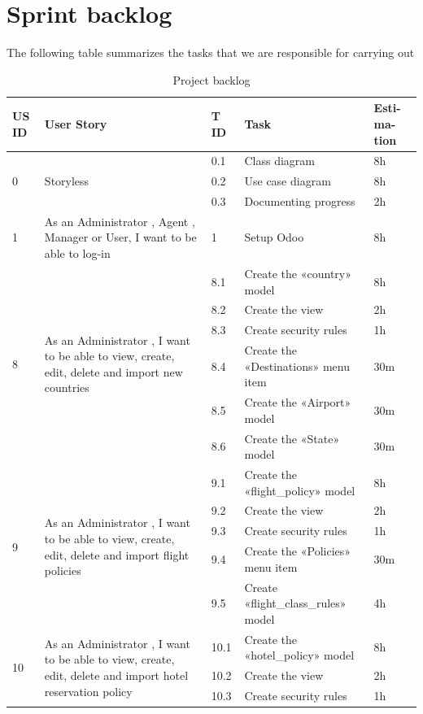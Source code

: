 \section{Sprint backlog}
The following table summarizes the tasks that we are responsible for carrying out 
\begin{center}
\begin{longtable}{|p{1cm}|p{}|p{}|p{}|p{}|}
\caption{ Project backlog }
\hline
\textbf{US ID} 
&\textbf{User Story}
&\textbf{T ID}
&\textbf{Task}
&\textbf{Esti- ma- tion}
\\
\hline
\multirow{ 3}{*}{0}
&\multirow{3}{*}{Storyless}
&0.1
&Class diagram
&8h\\\cline{3-5}
&
&0.2
&Use case diagram
&8h\\\cline{3-5}
&
&0.3
&Documenting progress
&2h\\\cline{3-5}
\hline
1
&As an Administrator , Agent , Manager or User, I want to be able to log-in
&1
&Setup Odoo
&8h
\\\hline


\multirow{ 6}{*}{8}
&\multirow{6}{=}{As an Administrator , I want to be able to view, create, edit, delete and import new countries}
&8.1
&Create the «country» model
&8h\\\cline{3-5}
&
&8.2
&Create the view
&2h\\\cline{3-5}
&
&8.3
&Create security rules
&1h\\\cline{3-5}
&
&8.4
&Create the «Destinations» menu item
&30m\\\cline{3-5}
&
&8.5
&Create the «Airport» model
&30m\\\cline{3-5}
&
&8.6
&Create the «State» model
&30m\\\cline{3-5}
\hline


\multirow{ 5}{*}{9}
&\multirow{5}{=}{As an Administrator , I want to be able to view, create, edit, delete and import flight policies}
&9.1
&Create the «flight\_policy» model
&8h\\\cline{3-5}
&
&9.2
&Create the view
&2h\\\cline{3-5}
&
&9.3
&Create security rules
&1h\\\cline{3-5}
&
&9.4
&Create the «Policies» menu item
&30m\\\cline{3-5}
&
&9.5
&Create «flight\_class\_rules» model
&4h\\\cline{3-5}
\hline


\multirow{ 3}{*}{10}
&\multirow{3}{=}{As an Administrator , I want to be able to view, create, edit, delete and import hotel reservation policy}
&10.1
&Create the «hotel\_policy» model
&8h\\\cline{3-5}
&
&10.2
&Create the view
&2h\\\cline{3-5}
&
&10.3
&Create security rules
&1h\\\cline{3-5}


\end{longtable}
\end{center}
